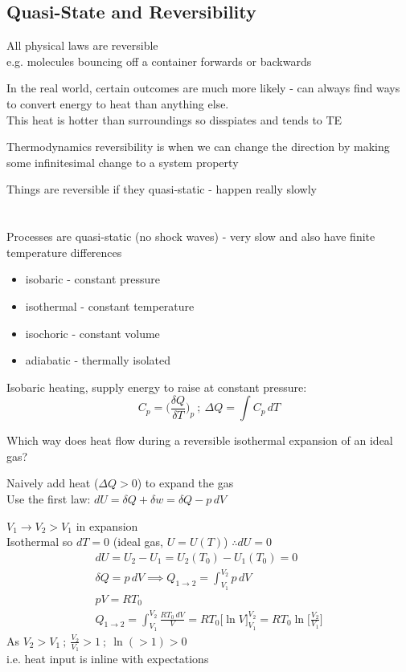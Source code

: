 \documentclass[a4paper, 11pt, normalem]{report}
\begin{document}
\section{Quasi-State and Reversibility}
All physical laws are reversible \\
e.g. molecules bouncing off a container forwards or backwards

In the real world, certain outcomes are much more likely - can always find ways to convert energy to heat than anything else. \\
This heat is hotter than surroundings so disspiates and tends to TE

Thermodynamics reversibility is when we can change the direction by making some infinitesimal change to a system property

Things are reversible if they quasi-static - happen really slowly

\chapter{}
Processes are quasi-static (no shock waves) - very slow and also have finite temperature differences
\begin{itemize}
    \item[] isobaric - constant pressure
    \item[] isothermal - constant temperature
    \item[] isochoric - constant volume
    \item[] adiabatic - thermally isolated
\end{itemize}
Isobaric heating, supply energy to raise at constant pressure:
\begin{equation*}
    C_p = \Big(\frac{\delta Q}{\delta T}\Big)_p ~;~ \Delta Q = \int C_p \, dT
\end{equation*}

Which way does heat flow during a reversible isothermal expansion of an ideal gas?

Naively add heat ($\Delta Q > 0$) to expand the gas \\
Use the first law: $dU = \delta Q + \delta w = \delta Q - p\,dV$

$V_1 \to V_2 > V_1$ in expansion \\
Isothermal so $dT = 0$ (ideal gas, $U = U(T)$) $\therefore dU = 0$
\begin{gather*}
    dU = U_2 - U_1 = U_{2}(T_{0}) - U_{1}(T_{0}) = 0 \\
    \delta Q = p\,dV \implies Q_{1\to2} = \int_{V_{1}}^{V_{2}} p\,dV \\
    pV = RT_0 \\
    Q_{1\to2} = \int_{V_{1}}^{V_{2}} \frac{RT_{0}\,dV}{V} = RT_{0}\Big[\ln V \Big]_{V_{1}}^{V_{2}} = RT_{0}\ln\bigg[\frac{V_{2}}{V_1}\bigg]
\end{gather*}
As $V_2 > V_1 ~;~ \frac{V_2}{V_1} > 1 ~;~ \ln(> 1) > 0$ \\
i.e. heat input is inline with expectations
\end{document}
